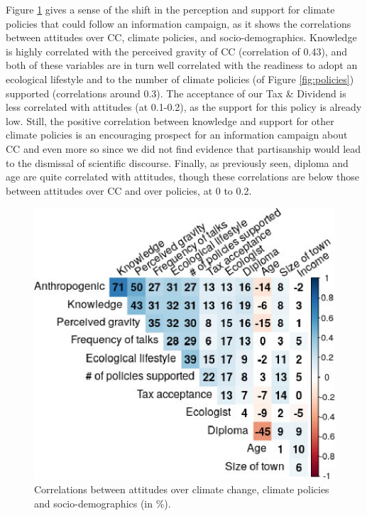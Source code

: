 \documentclass[english,5p,authoryear]{elsarticle}
\begin{document}
Figure \ref{fig:correlations} gives a sense of the shift in the perception and support for climate policies that could follow an information campaign, as it shows the correlations between attitudes over CC, climate policies, and socio-demographics. Knowledge is highly correlated with the perceived gravity of CC (correlation of 0.43), and both of these variables are in turn well correlated with the readiness to adopt an ecological lifestyle and to the number of climate policies (of Figure \ref{fig:policies}) supported (correlations around 0.3). The acceptance of our Tax \& Dividend is less correlated with attitudes (at 0.1-0.2), as the support for this policy is already low. Still, the positive correlation between knowledge and support for other climate policies is an encouraging prospect for an information campaign about CC and even more so since we did not find evidence that partisanship would lead to the dismissal of scientific discourse. Finally, as previously seen, diploma and age are quite correlated with attitudes, though these correlations are below those between attitudes over CC and over policies, at 0 to 0.2. 
%

\begin{figure}[!htbp]
\centering
\includegraphics[width=0.95\columnwidth]{Images_EPS/correlation_matrix2.eps}
\caption{Correlations between attitudes over climate change, climate policies and socio-demographics (in \%).}
\label{fig:correlations}
\end{figure}
\end{document}
